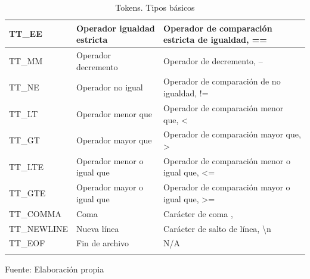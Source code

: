 \begin{center}
\begin{longtable}{|l|m{10em}|m{14em}|}
    \hline
    TT\_EE & Operador igualdad estricta & Operador de comparación estricta de igualdad, == \\
    \hline
    TT\_MM & Operador decremento & Operador de decremento, -- \\
    \hline
    TT\_NE &Operador no igual &Operador de comparación de no igualdad, != \\
    \hline
    TT\_LT & Operador menor que & Operador de comparación menor que, < \\
    \hline
    TT\_GT & Operador mayor que & Operador de comparación mayor que, > \\
    \hline
    TT\_LTE & Operador menor o igual que & Operador de comparación menor o igual que, <= \\
    \hline
    TT\_GTE & Operador mayor o igual que & Operador de comparación mayor o igual que, >= \\
    \hline
    TT\_COMMA & Coma & Carácter de coma , \\
    \hline
    TT\_NEWLINE & Nueva línea & Carácter de salto de línea, \textbackslash n \\
    \hline
    TT\_EOF & Fin de archivo & N/A \\
    \hline
    \caption{Tokens. Tipos básicos}
  \end{longtable}
  \vspace*{-2.5em}
  \centering Fuente: Elaboración propia
\end{center}

